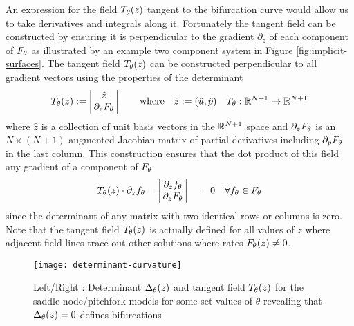 An expression for the field $T_{\theta}(z)$ tangent to the bifurcation curve would allow us to take derivatives and integrals along it. Fortunately the tangent field can be constructed by ensuring it is perpendicular to the gradient $\partial_z$ of each component of $F_{\theta}$ as illustrated by an example two component system in Figure \ref{fig:implicit-surfaces}. The tangent field $T_{\theta}(z)$ can be constructed perpendicular to all gradient vectors using the properties of the determinant \cite{Goldman2005CurvatureSurfaces}
\begin{align}
    T_{\theta}(z):=
    \left|\begin{matrix}
        \hat{z} \\
        \,\partial_{z}F_{\theta}\,
    \end{matrix}\right|
    \qquad\mathrm{where}\quad
    \hat{z}:=(\hat{u},\hat{p})\quad
	T_{\theta} : \mathbb{R}^{N+1}\rightarrow\mathbb{R}^{N+1}
	\label{eq:tangent-field}
\end{align}
where $\hat{z}$ is a collection of unit basis vectors in the $\mathbb{R}^{N+1}$ space and $\partial_{z}F_{\theta}$ is an $N\times(N+1)$ augmented Jacobian matrix of partial derivatives including $\partial_p F_{\theta}$ in the last column. This construction ensures that the dot product of this field any gradient of a component of $F_{\theta}$
\begin{align}
    T_{\theta}(z)\cdot\partial_z f_{\theta} =
    \left|\begin{matrix}
        \partial_z f_{\theta} \\
        \,\partial_{z}F_{\theta}\,
    \end{matrix}\right|
    \quad =0 \quad\forall f_{\theta}\in F_{\theta}
\end{align}
since the determinant of any matrix with two identical rows or columns is zero. Note that the tangent field $T_{\theta}(z)$ is actually defined for all values of $z$ where adjacent field lines trace out other solutions where rates $F_{\theta}(z)\neq0$.

\begin{figure}[H]
\centering{}
\captionsetup{justification=centering}
\texttt{[image: determinant-curvature]}
\caption{Left/Right : Determinant $\Delta_{\theta}(z)$ and tangent field $T_{\theta}(z)$ for the saddle-node/pitchfork models for some set values of $\theta$ revealing that $\Delta_{\theta}(z)=0$ defines bifurcations}
\label{fig:determinant-curvature}
\end{figure}

